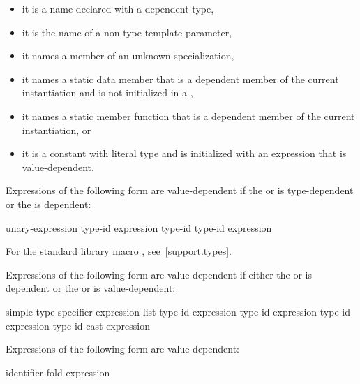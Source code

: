 \begin{itemize}
\item
it is a name declared with a dependent type,
\item
it is the name of a non-type template parameter,
\item
it names a member of an unknown specialization,
\item
it names a static data member that is a dependent member of the current
instantiation and is not initialized in a ,
\item
it names a static member function that is a dependent member of the current
instantiation, or
\item
it is a constant with literal type and is initialized with an
expression that is value-dependent.
\end{itemize}

Expressions of the following form are value-dependent if the
 or 
is type-dependent or the
is dependent:

\begin{ncbnftab}
 unary-expression\br
{} type-id \terminal{)}\br
{} expression \terminal{)}\br
{} type-id \terminal{)}\br
{} type-id \terminal{)}\br
{} \terminal{(} expression \terminal{)}
\end{ncbnftab}

\enternote For the standard library macro ,
see~\ref{support.types}.\exitnote

\pnum
Expressions of the following form are value-dependent if either the
or
is dependent or the
or
is value-dependent:

\begin{ncbnftab}
simple-type-specifier \terminal{(} expression-list\opt \terminal{)}\br
{} type-id \terminal{> (} expression \terminal{)}\br
{} type-id \terminal{> (} expression \terminal{)}\br
{} type-id \terminal{> (} expression \terminal{)}\br
\terminal{(} type-id \terminal{)} cast-expression
\end{ncbnftab}

\pnum
Expressions of the following form are value-dependent:

\begin{ncbnftab}
  \terminal{(} identifier \terminal{)}\br
fold-expression
\end{ncbnftab}

